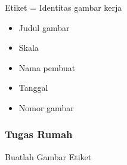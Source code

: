 \documentclass[../gbr_teknik.tex]{subfiles}
\begin{document}
\begin{frame}[t,mycolor=digiPH_red,mytitle=standard,dark]
	Etiket = Identitas gambar kerja
	\begin{itemize}
		\item Judul gambar
		\item Skala
		\item Nama pembuat
		\item Tanggal
		\item Nomor gambar
	\end{itemize}

\end{frame}

\begin{frame}[t,mycolor=digiPH_red,mytitle=standard,dark]
	\frametitle{Tugas Rumah}
	Buatlah Gambar Etiket
\end{frame}


\end{document}
